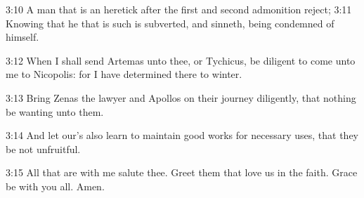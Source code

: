 3:10 A man that is an heretick after the first and second admonition
reject; 3:11 Knowing that he that is such is subverted, and sinneth,
being condemned of himself.

3:12 When I shall send Artemas unto thee, or Tychicus, be diligent to
come unto me to Nicopolis: for I have determined there to winter.

3:13 Bring Zenas the lawyer and Apollos on their journey diligently,
that nothing be wanting unto them.

3:14 And let our's also learn to maintain good works for necessary
uses, that they be not unfruitful.

3:15 All that are with me salute thee. Greet them that love us in the
faith. Grace be with you all. Amen.

